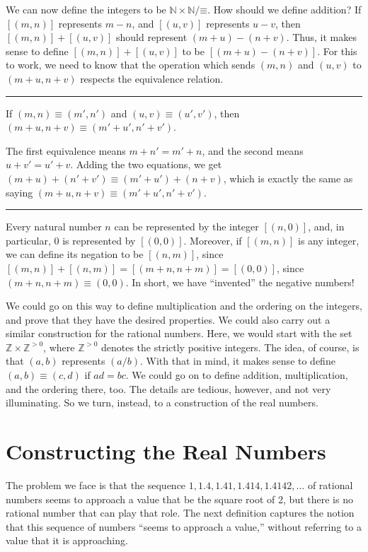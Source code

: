 \documentclass[letterpaper,10pt,english]{sphinxmanual}
\begin{document}
\sphinxAtStartPar
We can now define the integers to be \(\mathbb{N} \times \mathbb{N} / \mathord{\equiv}\). How should we define addition? If \([(m, n)]\) represents \(m - n\), and \([(u, v)]\) represents \(u - v\), then \([(m, n)] + [(u, v)]\) should represent \((m + u) - (n + v)\). Thus, it makes sense to define \([(m, n)] + [(u, v)]\) to be \([(m + u) - (n + v)]\). For this to work, we need to know that the operation which sends \((m, n)\) and \((u, v)\) to \((m + u, n + v)\) respects the equivalence relation.


\bigskip\hrule\bigskip


\sphinxAtStartPar
{} If \((m, n) \equiv (m', n')\) and \((u, v) \equiv (u', v')\), then \((m + u, n + v) \equiv (m' + u', n' + v')\).

\sphinxAtStartPar
{} The first equivalence means \(m + n' = m' + n\), and the second means \(u + v' = u' + v\). Adding the two equations, we get \((m + u) + (n' + v') \equiv (m' + u') + (n + v)\), which is exactly the same as saying \((m + u, n + v) \equiv (m' + u', n' + v')\).


\bigskip\hrule\bigskip


\sphinxAtStartPar
Every natural number \(n\) can be represented by the integer \([(n, 0)]\), and, in particular, \(0\) is represented by \([(0, 0)]\). Moreover, if \([(m, n)]\) is any integer, we can define its negation to be \([(n, m)]\), since \([(m, n)] + [(n, m)] = [(m + n, n + m)] = [(0, 0)]\), since \((m + n, n + m) \equiv (0, 0)\). In short, we have “invented” the negative numbers!

\sphinxAtStartPar
We could go on this way to define multiplication and the ordering on the integers, and prove that they have the desired properties. We could also carry out a similar construction for the rational numbers. Here, we would start with the set \(\mathbb{Z} \times \mathbb{Z}^{>0}\), where \(\mathbb{Z}^{>0}\) denotes the strictly positive integers. The idea, of course, is that \((a, b)\) represents \((a / b)\). With that in mind, it makes sense to define \((a, b) \equiv (c, d)\) if \(a d = b c\). We could go on to define addition, multiplication, and the ordering there, too. The details are tedious, however, and not very illuminating. So we turn, instead, to a construction of the real numbers.


\section{Constructing the Real Numbers}
\label{\detokenize{the_real_numbers:constructing-the-real-numbers}}
\sphinxAtStartPar
The problem we face is that the sequence \(1, 1.4, 1.41, 1.414, 1.4142, \ldots\) of rational numbers seems to approach a value that  be the square root of 2, but there is no rational number that can play that role. The next definition captures the notion that this sequence of numbers “seems to approach a value,” without referring to a value that it is approaching.
\end{document}

